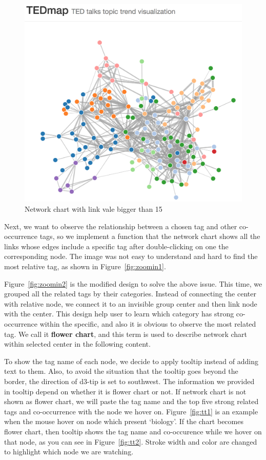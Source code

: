 \documentclass{report}
\numberwithin{figure}{section}
\begin{document}
\begin{figure}
\begin{center}
\includegraphics[scale=0.5]{networkChartProto}
\caption{Network chart with link vale bigger than 15}
\label{fig:networkwithcolor}
\end{center}
\end{figure}	

\quad Next, we want to observe the relationship between a chosen tag and other co-occurrence tags, so we implement a function that the network chart shows all the links whose edges include a specific tag after double-clicking on one the corresponding node. The image was not easy to understand and hard to find the most relative tag, as shown in Figure~\ref{fig:zoomin1}.

\quad Figure~\ref{fig:zoomin2} is the modified design to solve the above issue. This time, we grouped all the related tags by their categories. Instead of connecting the center with relative node, we connect it to an invisible group center and then link node with the center. This design help user to learn which category has strong co-occurrence within the specific, and also it is obvious to observe the most related tag. We call it \textbf{flower chart}, and this term is used to describe network chart within selected center in the following content.

\quad To show the tag name of each node, we decide to apply tooltip instead of adding text to them. Also, to avoid the situation that the tooltip goes beyond the border, the direction of d3-tip is set to southwest. The information we provided in tooltip depend on whether it is flower chart or not. If network chart is not shown as flower chart, we will paste the tag name and the top five strong related tags and co-occurrence with the node we hover on. Figure~\ref{fig:tt1} is an example when the mouse hover on node which present `biology'. If the chart becomes flower chart, then tooltip shows the tag name and co-occurence while we hover on that node, as you can see in Figure~\ref{fig:tt2}. Stroke width and color are changed to highlight which node we are watching.   
\end{document}
